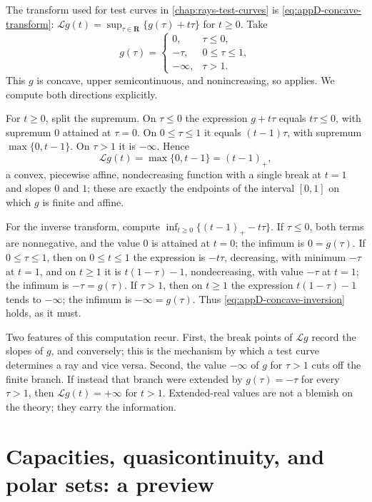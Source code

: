 \begin{example}
\label{ex:legendre-one-variable}
The transform used for test curves in \cref{chap:rays-test-curves} is
\eqref{eq:appD-concave-transform}:
$\mathcal Lg(t)=\sup_{\tau\in\mathbf R}\{g(\tau)+t\tau\}$ for $t\geq0$.  Take
\[
 g(\tau)=
 \begin{cases}
 0,&\tau\leq0,\\
 -\tau,&0\leq\tau\leq1,\\
 -\infty,&\tau>1 .
 \end{cases}
\]
This $g$ is concave, upper semicontinuous, and nonincreasing, so
 applies.  We compute both directions
explicitly.

For $t\geq0$, split the supremum.  On $\tau\leq0$ the expression $g+t\tau$
equals $t\tau\leq0$, with supremum $0$ attained at $\tau=0$.  On
$0\leq\tau\leq1$ it equals $(t-1)\tau$, with supremum $\max\{0,t-1\}$.  On
$\tau>1$ it is $-\infty$.  Hence
\[
 \mathcal Lg(t)=\max\{0,t-1\}=(t-1)_+ ,
\]
a convex, piecewise affine, nondecreasing function with a single break at
$t=1$ and slopes $0$ and $1$; these are exactly the endpoints of the interval
$[0,1]$ on which $g$ is finite and affine.

For the inverse transform, compute
$\inf_{t\geq0}\{(t-1)_+-t\tau\}$.  If $\tau\leq0$, both terms are
nonnegative, and the value $0$ is attained at $t=0$; the infimum is
$0=g(\tau)$.  If $0\leq\tau\leq1$, then on $0\leq t\leq1$ the expression is
$-t\tau$, decreasing, with minimum $-\tau$ at $t=1$, and on $t\geq1$ it is
$t(1-\tau)-1$, nondecreasing, with value $-\tau$ at $t=1$; the infimum is
$-\tau=g(\tau)$.  If $\tau>1$, then on $t\geq1$ the expression
$t(1-\tau)-1$ tends to $-\infty$; the infimum is $-\infty=g(\tau)$.  Thus
\eqref{eq:appD-concave-inversion} holds, as it must.

Two features of this computation recur.  First, the break points of
$\mathcal Lg$ record the slopes of $g$, and conversely; this is the mechanism
by which a test curve determines a ray and vice versa.  Second, the value
$-\infty$ of $g$ for $\tau>1$ cuts off the finite branch.  If instead that
branch were extended by $g(\tau)=-\tau$ for every $\tau>1$, then
$\mathcal Lg(t)=+\infty$ for $t>1$.  Extended-real values are
not a blemish on the theory; they carry the information.
\end{example}

\section{Capacities, quasicontinuity, and polar sets: a preview}
\label{sec:capacity-preview}


